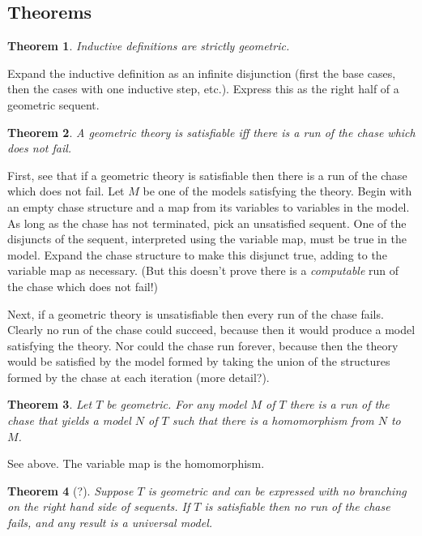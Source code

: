 \documentclass[12pt]{article}
\newtheorem{theorem}{Theorem}
\begin{document}
\subsection{Theorems}

  \begin{theorem}
    Inductive definitions are strictly geometric.
  \end{theorem}

  Expand the inductive definition as an infinite disjunction (first
  the base cases, then the cases with one inductive step,
  etc.). Express this as the right half of a geometric sequent.

  \begin{theorem}
    A geometric theory is satisfiable iff there is a run of the chase
    which does not fail.
  \end{theorem}

  First, see that if a geometric theory is satisfiable then there is a
  run of the chase which does not fail. Let $M$ be one of the models
  satisfying the theory. Begin with an empty chase structure and a map
  from its variables to variables in the model. As long as the chase
  has not terminated, pick an unsatisfied sequent. One of the
  disjuncts of the sequent, interpreted using the variable map, must
  be true in the model. Expand the chase structure to make this
  disjunct true, adding to the variable map as necessary. (But this
  doesn't prove there is a \emph{computable} run of the chase which
  does not fail!)

  Next, if a geometric theory is unsatisfiable then every run of the
  chase fails. Clearly no run of the chase could succeed, because then
  it would produce a model satisfying the theory. Nor could the chase
  run forever, because then the theory would be satisfied by the model
  formed by taking the union of the structures formed by the chase at
  each iteration (more detail?).

  \begin{theorem}
    Let $T$ be geometric.  For any model $M$ of $T$ there is a run of
    the chase that yields a model $N$ of $T$ such that there is a
    homomorphism from $N$ to $M$.
  \end{theorem}

  See above.  The variable map is the homomorphism.

  \begin{theorem}
    [?] Suppose $T$ is geometric and can be expressed with no
    branching on the right hand side of sequents.  If $T$ is
    satisfiable then no run of the chase fails, and any result is a
    universal model.
  \end{theorem}
\end{document}
